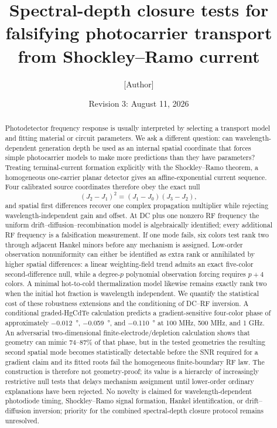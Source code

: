 \documentclass[11pt]{article}
\title{Spectral-depth closure tests for falsifying photocarrier transport from Shockley--Ramo current}
\author{[Author]}
\date{Revision 3: August 11, 2026}
\begin{document}
\maketitle

\begin{abstract}
Photodetector frequency response is usually interpreted by selecting a transport model and fitting material or circuit parameters. We ask a different question: can wavelength-dependent generation depth be used as an internal spatial coordinate that forces simple photocarrier models to make more predictions than they have parameters? Treating terminal-current formation explicitly with the Shockley--Ramo theorem, a homogeneous one-carrier planar detector gives an affine-exponential current sequence. Four calibrated source coordinates therefore obey the exact null
\[
(J_2-J_1)^2=(J_1-J_0)(J_3-J_2),
\]
and spatial first differences recover one complex propagation multiplier while rejecting wavelength-independent gain and offset. At DC plus one nonzero RF frequency the uniform drift--diffusion--recombination model is algebraically identified; every additional RF frequency is a falsification measurement. If one mode fails, six colors test rank two through adjacent Hankel minors before any mechanism is assigned. Low-order observation nonuniformity can either be identified as extra rank or annihilated by higher spatial differences: a linear weighting-field trend admits an exact five-color second-difference null, while a degree-$p$ polynomial observation forcing requires $p+4$ colors. A minimal hot-to-cold thermalization model likewise remains exactly rank two when the initial hot fraction is wavelength independent. We quantify the statistical cost of these robustness extensions and the conditioning of DC--RF inversion. A conditional graded-HgCdTe calculation predicts a gradient-sensitive four-color phase of approximately \SI{-0.012}{\degree}, \SI{-0.059}{\degree}, and \SI{-0.110}{\degree} at 100 MHz, 500 MHz, and 1 GHz. An adversarial two-dimensional finite-electrode/depletion calculation shows that geometry can mimic 74--87\% of that phase, but in the tested geometries the resulting second spatial mode becomes statistically detectable before the SNR required for a gradient claim and its fitted roots fail the homogeneous finite-boundary RF law. The construction is therefore not geometry-proof; its value is a hierarchy of increasingly restrictive null tests that delays mechanism assignment until lower-order ordinary explanations have been rejected. No novelty is claimed for wavelength-dependent photodiode timing, Shockley--Ramo signal formation, Hankel identification, or drift--diffusion inversion; priority for the combined spectral-depth closure protocol remains unresolved.
\end{abstract}
\end{document}
